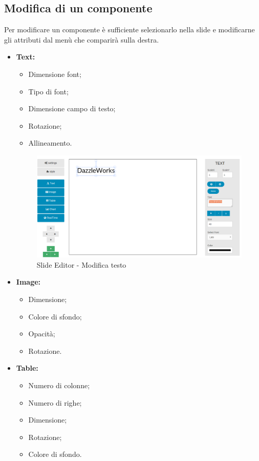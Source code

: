 \subsection{Modifica di un componente}
Per modificare un componente è sufficiente selezionarlo nella slide e modificarne gli attributi dal menù che comparirà sulla destra.
\begin{itemize}

	\item \textbf{Text:}
		\begin{itemize}
			\item Dimensione font;
			\item Tipo di font;
			\item Dimensione campo di testo;
			\item Rotazione;
			\item Allineamento.
		\end{itemize}
		 \begin{figure}[h] 
		    \centering 
		    \includegraphics[scale=0.37] {img/MUslideEditor.png}
		    \caption{Slide Editor - Modifica testo} 
		\end{figure}
	
	\item \textbf{Image:}
		\begin{itemize}
			\item Dimensione;
			\item Colore di sfondo;
			\item Opacità;
			\item Rotazione.
		\end{itemize}

	\item \textbf{Table:}
		\begin{itemize}
			\item Numero di colonne;
			\item Numero di righe;
			\item Dimensione;
			\item Rotazione;
			\item Colore di sfondo.
		\end{itemize}
		

\end{itemize}
